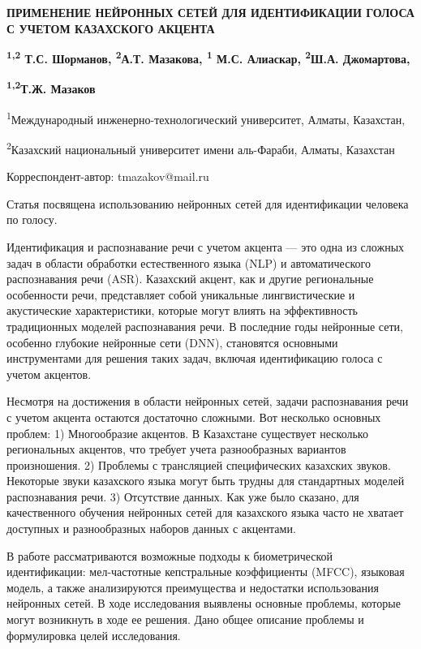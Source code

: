 
{\bfseries ПРИМЕНЕНИЕ НЕЙРОННЫХ СЕТЕЙ ДЛЯ ИДЕНТИФИКАЦИИ ГОЛОСА С УЧЕТОМ
КАЗАХСКОГО АКЦЕНТА}

{\bfseries \textsuperscript{1,2} Т.С. Шорманов, \textsuperscript{2}А.Т.
Мазакова, \textsuperscript{1} М.С. Алиаскар, \textsuperscript{2}Ш.А.
Джомартова,}

{\bfseries \textsuperscript{1,2}Т.Ж. Мазаков\textsuperscript{\envelope }}

\textsuperscript{1}Международный инженерно-технологический университет,
Алматы, Казахстан,

\textsuperscript{2}Казахский национальный университет имени аль-Фараби,
Алматы, Казахстан

\raggedright {\bfseries \textsuperscript{\envelope }}Корреспондент-автор: tmazakov@mail.ru

Статья посвящена использованию нейронных сетей для идентификации
человека по голосу.

Идентификация и распознавание речи с учетом акцента --- это одна из
сложных задач в области обработки естественного языка (NLP) и
автоматического распознавания речи (ASR). Казахский акцент, как и другие
региональные особенности речи, представляет собой уникальные
лингвистические и акустические характеристики, которые могут влиять на
эффективность традиционных моделей распознавания речи. В последние годы
нейронные сети, особенно глубокие нейронные сети (DNN), становятся
основными инструментами для решения таких задач, включая идентификацию
голоса с учетом акцентов.

Несмотря на достижения в области нейронных сетей, задачи распознавания
речи с учетом акцента остаются достаточно сложными. Вот несколько
основных проблем: 1) Многообразие акцентов. В Казахстане существует
несколько региональных акцентов, что требует учета разнообразных
вариантов произношения. 2) Проблемы с трансляцией специфических
казахских звуков. Некоторые звуки казахского языка могут быть трудны для
стандартных моделей распознавания речи. 3) Отсутствие данных. Как уже
было сказано, для качественного обучения нейронных сетей для казахского
языка часто не хватает доступных и разнообразных наборов данных с
акцентами.

В работе рассматриваются возможные подходы к биометрической
идентификации: мел-частотные кепстральные коэффициенты (MFCC), языковая
модель, а также анализируются преимущества и недостатки использования
нейронных сетей. В ходе исследования выявлены основные проблемы, которые
могут возникнуть в ходе ее решения. Дано общее описание проблемы и
формулировка целей исследования.

